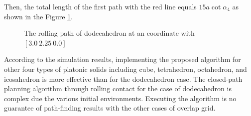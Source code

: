 \noindent Then, the total length of the first path with the red line equals $15a\cot{\alpha_4}$ as shown in the Figure \ref{fig:dodecaPath}.\\

\begin{center}
\begin{figure}[h]
\hfill
{}
\caption{The rolling path of dodecahedron at an coordinate with $[3.0\ 2.25\ 0.0]$}
\label{fig:dodecaPath}
\end{figure}
\end{center}

\noindent According to the simulation results, implementing the proposed algorithm for other four types of platonic solids including cube, tetrahedron, octahedron, and icosahedron is more effective than for the dodecahedron case. 
%
The closed-path planning algorithm through rolling contact for the case of dodecahedron is complex due the various initial environments. 
%
Executing the algorithm is no guarantee of path-finding results with the other cases of overlap grid.
